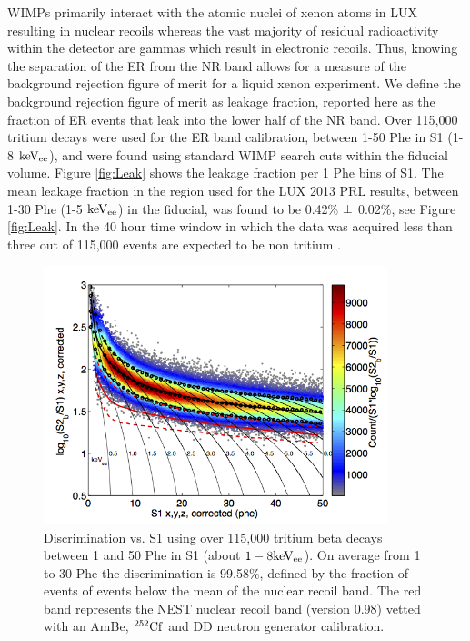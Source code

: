 WIMPs primarily interact with the atomic nuclei of xenon atoms in LUX resulting in nuclear recoils whereas the vast majority of residual radioactivity within the detector are gammas which result in electronic recoils. Thus, knowing the separation of the ER from the NR band allows for a measure of the background rejection figure of merit for a liquid xenon experiment. We define the background rejection figure of merit as leakage fraction, reported here as the fraction of ER events that leak into the lower half of the NR band. Over 115,000 tritium decays were used for the ER band calibration, between 1-50 Phe in S1 (1-8 $\rm keV_{ee}$), and were found using standard WIMP search cuts within the fiducial volume. 
Figure \ref{fig:Leak} shows the leakage fraction per 1 Phe bins of S1. The mean leakage fraction in the region used for the LUX 2013 PRL results, between 1-30 Phe (1-5 $\rm keV_{ee}$) in the fiducial, was found to be 0.42\% $\rm \pm$ 0.02\%, see Figure \ref{fig:Leak}. In the 40 hour time window in which the data was acquired less than three out of 115,000 events are expected to be non tritium \cite{LUX_BG}. 


\begin{figure}[h!]\centering
\includegraphics[width=100mm]{CH3T_fid_50_2_Dec_Tritium_Approval_Plots.png}
\caption{Discrimination vs. S1 using over 115,000 tritium beta decays between 1 and 50 Phe in S1 (about $\rm1-8 keV_{ee}$). On average from 1 to 30 Phe the discrimination is 99.58\%, defined by the fraction of events of events below the mean of the nuclear recoil band. The red band represents the NEST nuclear recoil band (version 0.98) vetted with an AmBe, $\rm^{252}Cf$ and DD neutron generator calibration.}
\label{fig:Band}
\end{figure}


